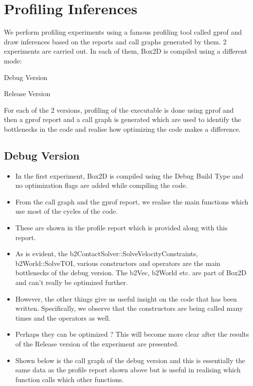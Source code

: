 \documentclass[11pt]{article}
\begin{document}
\section{Profiling Inferences}
We perform profiling experiments using a famous profiling tool called gprof and draw inferences based on the reports and call graphs generated by them. 2 experiments are carried out. In each of them, Box2D is compiled using a different mode:
	
	
	
		 Debug Version
	
	
		 Release Version
	
	
	
	For each of the 2 versions, profiling of the executable is done using gprof and then a gprof report and a call graph is generated which are used to identify the bottlenecks in the code and realise how optimizing the code makes a difference.
	\subsection{Debug Version}
		\begin{itemize}
		\item In the first experiment, Box2D is compiled using the Debug Build Type and no optimization flags are added while compiling the code. 
		\item From the call graph and the gprof report, we realise the main functions which use most of the cycles of the code.
		\item These are shown in the profile report which is provided along with this report.
\item As is evident, the b2ContactSolver::SolveVelocityConstraints, b2World::SolveTOI, various constructors and operators are the main bottlenecks of the debug version. The b2Vec, b2World etc. are part of Box2D and can't really be optimized further. 
\item However, the other things give us useful insight on the code that has been written. Specifically, we observe that the constructors are being called many times and the operators as well.
\item  Perhaps they can be optimized ? This will become more clear after the results of the Release version of the experiment are presented.
\item Shown below is the call graph of the debug version and this is essentially the same data as the profile report shown above but is useful in realising which function calls which other functions.
\end{itemize}
\end{document}
